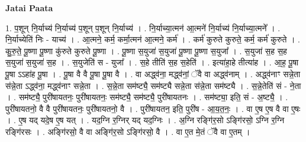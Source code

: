 \documentclass[17pt]{extarticle}
\begin{document}
\textbf{Jatai Paata} \newline

1. प॒शून् नि॒र्याच्य॑ नि॒र्याच्य॑ प॒शून् प॒शून् नि॒र्याच्य॑ । . नि॒र्याच्या॒त्मन॑ आ॒त्मने॑ नि॒र्याच्य॑ नि॒र्याच्या॒त्मने᳚ । . नि॒र्याच्येति॑ निः - याच्य॑ । . आ॒त्मने॒ कर्म॒ कर्मा॒त्मन॑ आ॒त्मने॒ कर्म॑ । . कर्म॑ कुरुते कुरुते॒ कर्म॒ कर्म॑ कुरुते । . कु॒रु॒ते॒ पू॒ष्णा पू॒ष्णा कु॑रुते कुरुते पू॒ष्णा । . पू॒ष्णा स॒युजा॑ स॒युजा॑ पू॒ष्णा पू॒ष्णा स॒युजा᳚ । . स॒युजा॑ स॒ह स॒ह स॒युजा॑ स॒युजा॑ स॒ह । . स॒युजेति॑ स - युजा᳚ । . स॒हे तीति॑ स॒ह स॒हेति॑ । . इत्या॑हा॒हे तीत्या॑ह । . आ॒ह॒ पू॒षा पू॒षा ऽऽहा॑ह पू॒षा । . पू॒षा वै वै पू॒षा पू॒षा वै । . वा अद्ध्व॑ना॒ मद्ध्व॑नां॒ ॅवै वा अद्ध्व॑नाम् । . अद्ध्व॑नाꣳ सन्ने॒ता स॑न्ने॒ता ऽद्ध्व॑ना॒ मद्ध्व॑नाꣳ सन्ने॒ता । . स॒न्ने॒ता सम॑ष्ट्यै॒ सम॑ष्ट्यै सन्ने॒ता स॑न्ने॒ता सम॑ष्ट्यै । . स॒न्ने॒तेति॑ सं - ने॒ता । . सम॑ष्ट्यै॒ पुरी॑षायतनः॒ पुरी॑षायतनः॒ सम॑ष्ट्यै॒ सम॑ष्ट्यै॒ पुरी॑षायतनः । . सम॑ष्ट्या॒ इति॒ सं - अ॒ष्ट्यै॒ । . पुरी॑षायतनो॒ वै वै पुरी॑षायतनः॒ पुरी॑षायतनो॒ वै । . पुरी॑षायतन॒ इति॒ पुरी॑ष - आ॒य॒त॒नः॒ । . वा ए॒ष ए॒ष वै वा ए॒षः । . ए॒ष यद् यदे॒ष ए॒ष यत् । . यद॒ग्नि र॒ग्निर् यद् यद॒ग्निः । . अ॒ग्नि रङ्गि॑र॒सो ऽङ्गि॑रसो॒ ऽग्नि र॒ग्नि रङ्गि॑रसः । . अङ्गि॑रसो॒ वै वा अङ्गि॑र॒सो ऽङ्गि॑रसो॒ वै । . वा ए॒त मे॒तं ॅवै वा ए॒तम् । \newline
\end{document}
